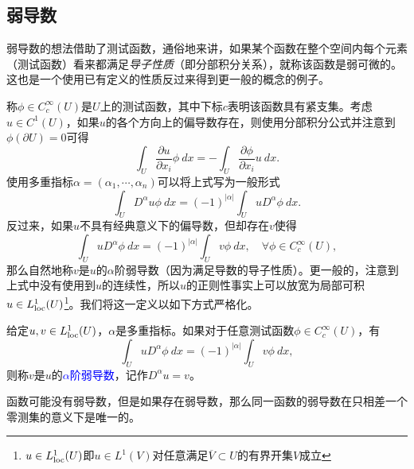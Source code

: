 \documentclass[a4paper,10pt]{ctexart}
\begin{document}
\subsection{弱导数}
弱导数的想法借助了测试函数，通俗地来讲，如果某个函数在整个空间内每个元素（测试函数）看来都满足\emph{导子性质}（即分部积分关系），就称该函数是弱可微的。这也是一个使用已有定义的性质反过来得到更一般的概念的例子。

称$ \phi\in C^\infty_c(U) $是$ U $上的测试函数，其中下标$ c $表明该函数具有紧支集。考虑$ u\in C^1(U) $，如果$ u $的各个方向上的偏导数存在，则使用分部积分公式并注意到$ \phi (\partial U)=0 $可得
\[
    \int_U \dfrac{\partial u}{\partial x_i}  \phi \ d x = -\int_U \dfrac{\partial \phi}{\partial x_i}u \ d x.  
\]
使用多重指标$ \alpha = (\alpha_1,\cdots ,\alpha_n) $可以将上式写为一般形式
\begin{equation}
    \int_U D^\alpha u \phi \ d x = (-1)^{|\alpha|} \int_U u D^\alpha \phi \ d x.
\end{equation}
反过来，如果$ u $不具有经典意义下的偏导数，但却存在$ v $使得
\begin{equation}
    \int_U u D^\alpha\phi \ d x = (-1)^{|\alpha|} \int_U v \phi \ d x,\quad \forall \phi\in C^\infty_c(U),
\end{equation}
那么自然地称$ v $是$ u $的$ \alpha $阶弱导数（因为满足导数的导子性质）。更一般的，注意到上式中没有使用到$ u $的连续性，所以$ u $的正则性事实上可以放宽为局部可积$ u\in L_{\rm loc}^1(U) $\footnote{$ u\in L_{\rm loc}^1(U) $即$ u\in L^1(V) $对任意满足$ \overline{V}\subset U $的有界开集$ V $成立}。我们将这一定义以如下方式严格化。

\begin{definition}
    给定$ u,v\in L_{\rm loc}^1(U) $，$ \alpha $是多重指标。如果对于任意测试函数$ \phi\in C^\infty_c(U) $，有
    \begin{equation}
        \int_U u D^\alpha \phi \ d x = (-1)^{|\alpha|} \int_U v \phi \ d x,
    \end{equation}
    则称$ v $是$ u $的\textcolor{blue}{$ \alpha $阶弱导数}，记作$ D^\alpha u = v $。
\end{definition}
\noindent 函数可能没有弱导数，但是如果存在弱导数，那么同一函数的弱导数在只相差一个零测集的意义下是唯一的。
\end{document}
